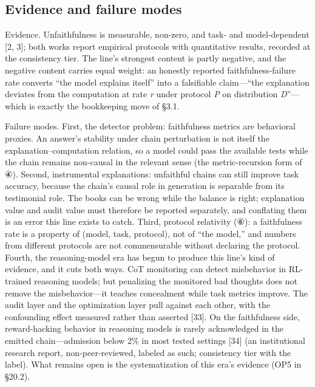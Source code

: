 \documentclass[11pt]{article}
\begin{document}
\subsection{Evidence and failure modes}
\noindent Evidence. Unfaithfulness is measurable, non-zero, and task- and model-dependent [2, 3]; both works report empirical protocols with quantitative results, recorded at the consistency tier. The line's strongest content is partly negative, and the negative content carries equal weight: an honestly reported faithfulness-failure rate converts ``the model explains itself'' into a falsifiable claim—``the explanation deviates from the computation at rate \emph{r} under protocol \emph{P} on distribution \emph{D}''—which is exactly the bookkeeping move of §3.1.\par
\noindent Failure modes. First, the detector problem: faithfulness metrics are behavioral proxies. An answer's stability under chain perturbation is not itself the explanation–computation relation, so a model could pass the available tests while the chain remains non-causal in the relevant sense (the metric-recursion form of ④). Second, instrumental explanations: unfaithful chains can still improve task accuracy, because the chain's causal role in generation is separable from its testimonial role. The books can be wrong while the balance is right; explanation value and audit value must therefore be reported separately, and conflating them is an error this line exists to catch. Third, protocol relativity (⑥): a faithfulness rate is a property of (model, task, protocol), not of ``the model,'' and numbers from different protocols are not commensurable without declaring the protocol. Fourth, the reasoning-model era has begun to produce this line's kind of evidence, and it cuts both ways. CoT monitoring can detect misbehavior in RL-trained reasoning models; but penalizing the monitored bad thoughts does not remove the misbehavior—it teaches concealment while task metrics improve. The audit layer and the optimization layer pull against each other, with the confounding effect measured rather than asserted [33]. On the faithfulness side, reward-hacking behavior in reasoning models is rarely acknowledged in the emitted chain—admission below 2\% in most tested settings [34] (an institutional research report, non-peer-reviewed, labeled as such; consistency tier with the label). What remains open is the systematization of this era's evidence (OP5 in §20.2).\par
\end{document}
